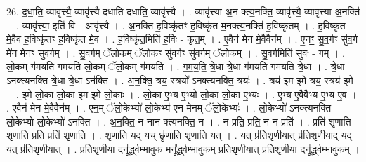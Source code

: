 \documentclass[17pt]{extarticle}
\begin{document}
26. द॒धा॒ति॒ व्यावृ॑त्त्यै॒ व्यावृ॑त्त्यै दधाति दधाति॒ व्यावृ॑त्त्यै । . व्यावृ॑त्त्या अ॒न क्त्य॒नक्ति॒ व्यावृ॑त्त्यै॒ व्यावृ॑त्त्या अ॒नक्ति॑ । . व्यावृ॑त्त्या॒ इति॑ वि - आवृ॑त्त्यै । . अ॒नक्ति॑ ह॒विष्कृ॑तꣳ ह॒विष्कृ॑त म॒नक्त्य॒नक्ति॑ ह॒विष्कृ॑तम् । . ह॒विष्कृ॑त मे॒वैव ह॒विष्कृ॑तꣳ ह॒विष्कृ॑त मे॒व । . ह॒विष्कृ॑त॒मिति॑ ह॒विः - कृ॒त॒म् । . ए॒वैन॑ मेन मे॒वैवैन᳚म् । . ए॒नꣳ॒॒ सु॒व॒र्गꣳ सु॑व॒र्ग मे॑न मेनꣳ सुव॒र्गम् । . सु॒व॒र्गम् ॅलो॒कम् ॅलो॒कꣳ सु॑व॒र्गꣳ सु॑व॒र्गम् ॅलो॒कम् । . सु॒व॒र्गमिति॑ सुवः - गम् । . लो॒कम् ग॑मयति गमयति लो॒कम् ॅलो॒कम् ग॑मयति । . ग॒म॒य॒ति॒ त्रे॒धा त्रे॒धा ग॑मयति गमयति त्रे॒धा । . त्रे॒धा ऽन॑क्त्यनक्ति त्रे॒धा त्रे॒धा ऽन॑क्ति । . अ॒न॒क्ति॒ त्रय॒ स्त्रयो॑ ऽनक्त्यनक्ति॒ त्रयः॑ । . त्रय॑ इ॒म इ॒मे त्रय॒ स्त्रय॑ इ॒मे । . इ॒मे लो॒का लो॒का इ॒म इ॒मे लो॒काः । . लो॒का ए॒भ्य ए॒भ्यो लो॒का लो॒का ए॒भ्यः । . ए॒भ्य ए॒वैवैभ्य ए॒भ्य ए॒व । . ए॒वैन॑ मेन मे॒वैवैन᳚म् । . ए॒न॒म् ॅलो॒केभ्यो॑ लो॒केभ्य॑ एन मेनम् ॅलो॒केभ्यः॑ । . लो॒केभ्यो॑ ऽनक्त्यनक्ति लो॒केभ्यो॑ लो॒केभ्यो॑ ऽनक्ति । . अ॒न॒क्ति॒ न नान॑ क्त्यनक्ति॒ न । . न प्रति॒ प्रति॒ न न प्रति॑ । . प्रति॑ शृणाति शृणाति॒ प्रति॒ प्रति॑ शृणाति । . शृ॒णा॒ति॒ यद् यच् छृ॑णाति शृणाति॒ यत् । . यत् प्र॑तिशृणी॒यात् प्र॑तिशृणी॒याद् यद् यत् प्र॑तिशृणी॒यात् । . प्र॒ति॒शृ॒णी॒या दनू᳚र्द्ध्वम्भावुक॒ मनू᳚र्द्ध्वम्भावुकम् प्रतिशृणी॒यात् प्र॑तिशृणी॒या दनू᳚र्द्ध्वम्भावुकम् । \newline
\end{document}
